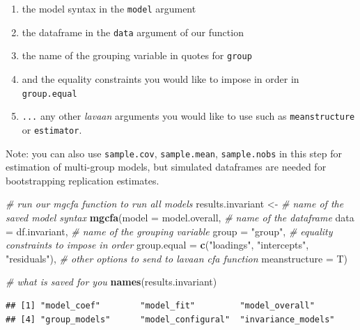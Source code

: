 \documentclass[
  man]{apa7}
\newenvironment{Shaded}{\begin{snugshade}}{\end{snugshade}}
\newcommand{\AttributeTok}[1]{\textcolor[rgb]{0.13,0.29,0.53}{#1}}
\newcommand{\CommentTok}[1]{\textcolor[rgb]{0.56,0.35,0.01}{\textit{#1}}}
\newcommand{\FunctionTok}[1]{\textcolor[rgb]{0.13,0.29,0.53}{\textbf{#1}}}
\newcommand{\NormalTok}[1]{#1}
\newcommand{\OtherTok}[1]{\textcolor[rgb]{0.56,0.35,0.01}{#1}}
\newcommand{\StringTok}[1]{\textcolor[rgb]{0.31,0.60,0.02}{#1}}
\providecommand{\tightlist}{%
  \setlength{\itemsep}{0pt}\setlength{\parskip}{0pt}}
\begin{document}
\begin{enumerate}
\def\labelenumi{\arabic{enumi})}
\tightlist
\item
  the model syntax in the \texttt{model} argument
\item
  the dataframe in the \texttt{data} argument of our function
\item
  the name of the grouping variable in quotes for \texttt{group}
\item
  and the equality constraints you would like to impose in order in \texttt{group.equal}
\item
  \texttt{...} any other \emph{lavaan} arguments you would like to use such as \texttt{meanstructure} or \texttt{estimator}.
\end{enumerate}

Note: you can also use \texttt{sample.cov}, \texttt{sample.mean}, \texttt{sample.nobs} in this step for estimation of multi-group models, but simulated dataframes are needed for bootstrapping replication estimates.

\small

\begin{Shaded}
\begin{Highlighting}[]
\CommentTok{\# run our mgcfa function to run all models}
\NormalTok{results.invariant }\OtherTok{\textless{}{-}} 
  \CommentTok{\# name of the saved model syntax}
  \FunctionTok{mgcfa}\NormalTok{(}\AttributeTok{model =}\NormalTok{ model.overall, }
        \CommentTok{\# name of the dataframe}
        \AttributeTok{data =}\NormalTok{ df.invariant,}
        \CommentTok{\# name of the grouping variable}
        \AttributeTok{group =} \StringTok{"group"}\NormalTok{,}
        \CommentTok{\# equality constraints to impose in order}
        \AttributeTok{group.equal =} \FunctionTok{c}\NormalTok{(}\StringTok{"loadings"}\NormalTok{, }\StringTok{"intercepts"}\NormalTok{, }\StringTok{"residuals"}\NormalTok{),}
        \CommentTok{\# other options to send to lavaan cfa function}
        \AttributeTok{meanstructure =}\NormalTok{ T)}

\CommentTok{\# what is saved for you}
\FunctionTok{names}\NormalTok{(results.invariant)}
\end{Highlighting}
\end{Shaded}

\normalsize

\begin{verbatim}
## [1] "model_coef"        "model_fit"         "model_overall"    
## [4] "group_models"      "model_configural"  "invariance_models"
\end{verbatim}
\end{document}
